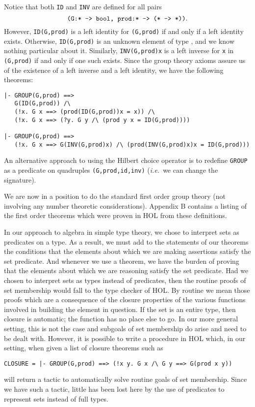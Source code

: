 Notice that both {\tt ID} and {\tt INV} are defined for all pairs
$$\mbox{\tt (G:* -> bool, prod:* -> (* -> *))}.$$
However, {\tt ID(G,prod)} is a left identity for {\tt (G,prod)} if and
only if a left identity exists.  Otherwise, {\tt ID(G,prod)} is an
unknown element of type {\tt *}, and we know nothing particular about
it.  Similarly, {\tt INV(G,prod)x} is a left inverse for {\tt x} in
{\tt (G,prod)} if and only if one such exists.  Since the group theory
axioms assure us of the existence of a left inverse and a left
identity, we have the following theorems:
\begin{verbatim}
|- GROUP(G,prod) ==>
   G(ID(G,prod)) /\
   (!x. G x ==> (prod(ID(G,prod))x = x)) /\
   (!x. G x ==> (?y. G y /\ (prod y x = ID(G,prod))))

|- GROUP(G,prod) ==>
   (!x. G x ==> G(INV(G,prod)x) /\ (prod(INV(G,prod)x)x = ID(G,prod)))
\end{verbatim}
An alternative approach to using the Hilbert choice operator is to
redefine {\tt GROUP} as a predicate on quadruples {\tt (G,prod,id,inv)}
({\it i.e.}~we can change the signature).

We are now in a position to do the standard first order group theory
(not involving any number theoretic considerations).  Appendix B
contains a listing of the first order theorems which were proven in
HOL from these definitions.

In our approach to algebra in simple type theory, we chose to
interpret sets as predicates on a type.  As a result, we must add to
the statements of our theorems the conditions that the elements about
which we are making assertions satisfy the set predicate.  And whenever
we use a theorem, we have the burden of proving that the elements about
which we are reasoning satisfy the set predicate.  Had we chosen to
interpret sets as types instead of predicates, then the routine proofs
of set membership would fall to the type checker of HOL.  By routine
we mean those proofs which are a consequence of the closure properties
of the various functions involved in building the element in question.
If the set is an entire type, then closure is automatic; the function
has no place else to go.  In our more general setting, this is not the
case and subgoals of set membership do arise and need to be dealt
with.  However, it is possible to write a procedure in HOL which, in
our setting, when given a list of closure theorems such as
\begin{verbatim}
CLOSURE = |- GROUP(G,prod) ==> (!x y. G x /\ G y ==> G(prod x y))
\end{verbatim}	
will return a tactic to automatically solve routine goals of set
membership.  Since we have such a tactic, little has been lost here
by the use of predicates to represent sets instead of full types.

